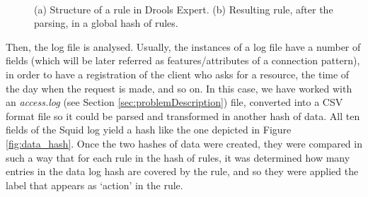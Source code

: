 \documentclass{llncs}
\begin{document}
\begin{figure}[htb]
\centering
{}
~
\caption{(a) Structure of a rule in Drools Expert. (b) Resulting rule, after the parsing, in a global hash of rules. \label{fig:drools_hash}}
\end{figure}

Then, the log file is analysed. Usually, the instances of a log file have a number of fields (which will be later referred as features/attributes of a connection pattern), in order to have a registration of the client who asks for a resource, the time of the day when the request is made, and so on. In this case, we have worked with an \textit{access.log} (see Section \ref{sec:problemDescription}) file, converted into a CSV format file so it could be parsed and transformed in another hash of data. All ten fields of the Squid log yield a hash like the one depicted in Figure \ref{fig:data_hash}. Once the two hashes of data were created, they were compared in such a way that for each rule in the hash of rules, it was determined how many entries in the data log hash are covered by the rule, and so they were applied the label that appears as `action' in the rule.
\end{document}
